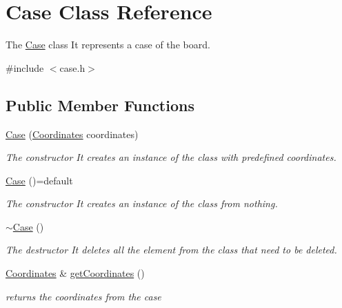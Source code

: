 \hypertarget{class_case}{}\section{Case Class Reference}
\label{class_case}


The \hyperlink{class_case}{Case} class It represents a case of the board.  




{\ttfamily \#include $<$case.\+h$>$}

\subsection*{Public Member Functions}
\begin{DoxyCompactItemize}
\item 
\hyperlink{class_case_aa159b3687a5f33ef6ac7d461fa8bf948}{Case} (\hyperlink{struct_coordinates}{Coordinates} coordinates)
\begin{DoxyCompactList}\small\item\em The constructor It creates an instance of the class with predefined coordinates. \end{DoxyCompactList}\item 
\mbox{\label{class_case_a32e1ca352eb4c7451897107758779c5d}} 
\hyperlink{class_case_a32e1ca352eb4c7451897107758779c5d}{Case} ()=default
\begin{DoxyCompactList}\small\item\em The constructor It creates an instance of the class from nothing. \end{DoxyCompactList}\item 
\mbox{\label{class_case_ab004564aae3e15db0c7fd5dde0b4c379}} 
\hyperlink{class_case_ab004564aae3e15db0c7fd5dde0b4c379}{$\sim$\+Case} ()
\begin{DoxyCompactList}\small\item\em The destructor It deletes all the element from the class that need to be deleted. \end{DoxyCompactList}\item 
\hyperlink{struct_coordinates}{Coordinates} \& \hyperlink{class_case_a6a95d5189d914c65d7a4db0f007ff533}{get\+Coordinates} ()
\begin{DoxyCompactList}\small\item\em returns the coordinates from the case \end{DoxyCompactList}\item 

\end{DoxyCompactItemize}
